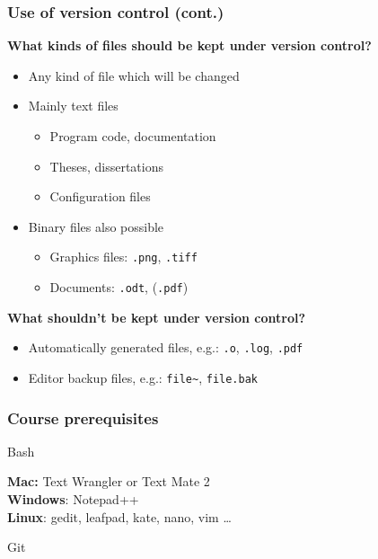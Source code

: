 \documentclass[handout,notes]{gittalk}
\begin{document}
\begin{frame}
\frametitle{Use of version control (cont.)}
\textbf{What kinds of files should be kept under version control?}\\[0.5em]
\begin{itemize}
\item Any kind of file which will be changed
\item Mainly text files
    \begin{itemize}
    \item Program code, documentation
    \item Theses, dissertations
    \item Configuration files
    \end{itemize}
\item Binary files also possible
    \begin{itemize}
    \item Graphics files: \texttt{.png}, \texttt{.tiff}
    \item Documents: \texttt{.odt}, (\texttt{.pdf})
    \end{itemize}
\end{itemize}
\vspace*{1em}
\textbf{What shouldn't be kept under version control?}\\[0.5em]
\begin{itemize}
\item Automatically generated files, e.g.: \texttt{.o}, \texttt{.log},
    \texttt{.pdf}
\item Editor backup files, e.g.: \texttt{file\~}, \texttt{file.bak}
\end{itemize}
\end{frame}

\begin{frame}[fragile]
\frametitle{Course prerequisites}
\begin{tcolorbox}
Bash
\end{tcolorbox}
\vspace*{1em}
\begin{tcolorbox}[title=Text editor]
\textbf{Mac:} Text Wrangler or Text Mate 2\\
\textbf{Windows}: Notepad++\\
\textbf{Linux}: gedit, leafpad, kate, nano, vim \dots
\end{tcolorbox}
\vspace*{1em}
\begin{tcolorbox}
Git
\end{tcolorbox}
\end{frame}
\end{document}
